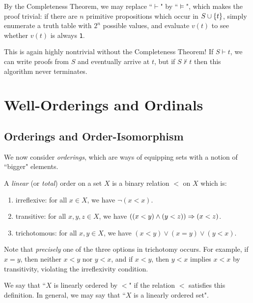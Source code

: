 \documentclass{article}
\begin{document}
\begin{prf}
    By the Completeness Theorem, we may replace ``$\vdash$" by ``$\vDash$", which makes the proof trivial: if there are $n$ primitive propositions which occur in $S \cup \left\lbrace t \right\rbrace$, simply enumerate a truth table with $2^n$ possible values, and evaluate $v(t)$ to see whether $v(t)$ is always \texttt{1}.
\end{prf}

\begin{note}
	This is again highly nontrivial without the Completeness Theorem! If $S \vdash t$, we can write proofs from $S$ and eventually arrive at $t$, but if $S \not\vdash t$ then this algorithm never terminates.
\end{note}


\pagebreak
\section{Well-Orderings and Ordinals}
\subsection{Orderings and Order-Isomorphism}
\label{section-ordinals-order-isomorphism}

We now consider 	\textit{orderings}, which are ways of equipping sets with a notion of ``bigger" elements.

\begin{definition}
	\label{definition-total-linear-order}
    A \textit{linear} (or \textit{total}) order on a set $X$ is a binary relation $<$ on $X$ which is:
    \begin{enumerate}
    	\item irreflexive: for all $x \in X$, we have $\lnot (x < x)$.
    	\item transitive: for all $x, y, z \in X$, we have $((x < y) \land (y < z)) \Rightarrow (x < z)$.
    	\item trichotomous: for all $x, y \in X$, we have $(x < y) \lor (x = y) \lor (y < x)$.
	\end{enumerate}
	Note that \textit{precisely} one of the three options in trichotomy occurs. For example, if $x = y$, then neither $x < y$ nor $y < x$, and if $x < y$, then $y < x$ implies $x < x$ by transitivity, violating the irreflexivity condition.
\end{definition}

We say that ``$X$ is linearly ordered by $<$" if the relation $<$ satisfies this definition. In general, we may say that ``$X$ is a linearly ordered set".
\end{document}
